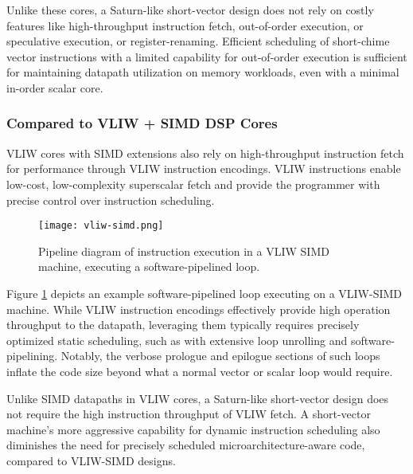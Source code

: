 Unlike these cores, a Saturn-like short-vector design does not rely on costly features like high-throughput instruction fetch, out-of-order execution, or speculative execution, or register-renaming.
Efficient scheduling of short-chime vector instructions with a limited capability for out-of-order execution is sufficient for maintaining datapath utilization on memory workloads, even with a minimal in-order scalar core.

\subsubsection{Compared to VLIW + SIMD DSP Cores}

VLIW cores with SIMD extensions also rely on high-throughput instruction fetch for performance through VLIW instruction encodings.
VLIW instructions enable low-cost, low-complexity superscalar fetch and provide the programmer with precise control over instruction scheduling.

\begin{figure}[h]
  \centering
  \texttt{[image: vliw-simd.png]}
  \caption{Pipeline diagram of instruction execution in a VLIW SIMD machine, executing a software-pipelined loop.}
  \label{fig:vliw}
\end{figure}

Figure \ref{fig:vliw} depicts an example software-pipelined loop executing on a VLIW-SIMD machine.
While VLIW instruction encodings effectively provide high operation throughput to the datapath, leveraging them typically requires precisely optimized static scheduling, such as with extensive loop unrolling and software-pipelining.
Notably, the verbose prologue and epilogue sections of such loops inflate the code size beyond what a normal vector or scalar loop would require.

Unlike SIMD datapaths in VLIW cores, a Saturn-like short-vector design does not require the high instruction throughput of VLIW fetch.
A short-vector machine's more aggressive capability for dynamic instruction scheduling also diminishes the need for precisely scheduled microarchitecture-aware code, compared to VLIW-SIMD designs.
